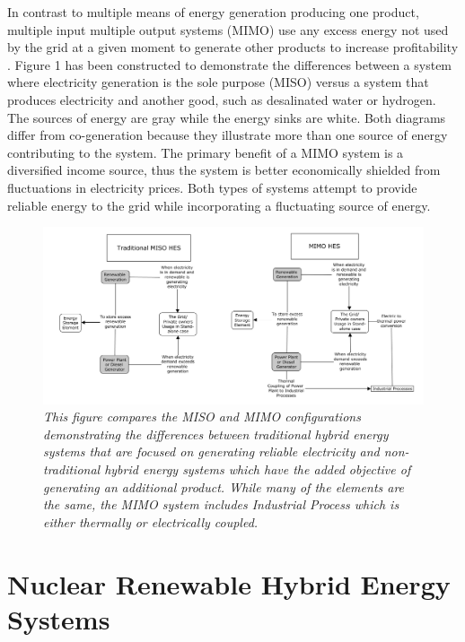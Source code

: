 \documentclass[12pt]{UIdahoMastersThesis}
\begin{document}
In contrast to multiple means of energy generation producing one product, multiple input multiple output systems (MIMO) use any excess energy not used by the grid at a given moment to generate other products to increase profitability \cite {Garcia2013}. Figure 1 has been constructed to demonstrate the differences between a system where electricity generation is the sole purpose (MISO) versus a system that produces electricity and another good, such as desalinated water or hydrogen. The sources of energy are gray while the energy sinks are white. Both diagrams differ from co-generation because they illustrate more than one source of energy contributing to the system. The primary benefit of a MIMO system is a diversified income source, thus the system is better economically shielded from fluctuations in electricity prices. Both types of systems attempt to provide reliable energy to the grid while incorporating a fluctuating source of energy.

\begin{figure}
\includegraphics[width=\textwidth]{MISO_MIMO.png}
\caption{\small \sl This figure compares the MISO and MIMO configurations demonstrating the differences between traditional hybrid energy systems that are focused on generating reliable electricity and non-traditional hybrid energy systems which have the added objective of generating an additional product.  While many of the elements are the same, the MIMO system includes  Industrial Process which is either thermally or electrically coupled.}
\end{figure}

\section{Nuclear Renewable Hybrid Energy Systems}
\end{document}
